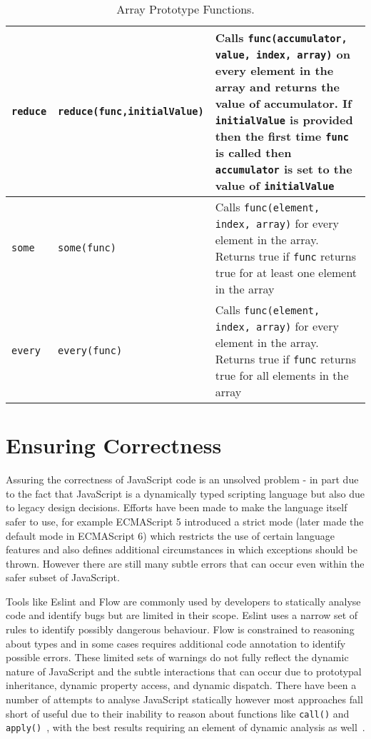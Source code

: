 \documentclass[]{final_report}
\begin{document}
\begin{table}[t]
\begin{tabular}{|p{2cm}|p{4.2cm}|p{9cm}|}
\lstinline|reduce| & {\lstinline|reduce(func,initialValue)|} & Calls {\lstinline|func(accumulator, value, index, array)|} on every element in the array and returns the value of accumulator. If {\lstinline|initialValue|} is provided then the first time {\lstinline|func|} is called then {\lstinline|accumulator|} is set to the value of {\lstinline|initialValue|} \\ \hline
\lstinline|some| & {\lstinline|some(func)|} & Calls {\lstinline|func(element, index, array)|} for every element in the array. Returns true if {\lstinline|func|} returns true for at least one element in the array \\ \hline
\lstinline|every| & {\lstinline|every(func)|} & Calls {\lstinline|func(element, index, array)|} for every element in the array. Returns true if {\lstinline|func|} returns true for all elements in the array \\ \hline
\end{tabular}
\caption{Array Prototype Functions.}
\label{table:array-prototype}
\end{table}

\section{Ensuring Correctness}
Assuring the correctness of JavaScript code is an unsolved problem - in part due to the fact that JavaScript is a dynamically typed scripting language but also due to legacy design decisions. Efforts have been made to make the language itself safer to use, for example ECMAScript 5 introduced a strict mode (later made the default mode in ECMAScript 6) which restricts the use of certain language features and also defines additional circumstances in which exceptions should be thrown. However there are still many subtle errors that can occur even within the safer subset of JavaScript.

Tools like Eslint and Flow are commonly used by developers to statically analyse code and identify bugs but are limited in their scope. Eslint uses a narrow set of rules to identify possibly dangerous behaviour. Flow is constrained to reasoning about types and in some cases requires additional code annotation to identify possible errors. These limited sets of warnings do not fully reflect the dynamic nature of JavaScript and the subtle interactions that can occur due to prototypal inheritance, dynamic property access, and dynamic dispatch. There have been a number of attempts to analyse JavaScript statically however most approaches fall short of useful due to their inability to reason about functions like \lstinline{call()} and \lstinline{apply()}~\cite{sridharan2012correlation}, with the best results requiring an element of dynamic analysis as well~\cite{logozzo2010rata, wei2013practical}.
\end{document}
